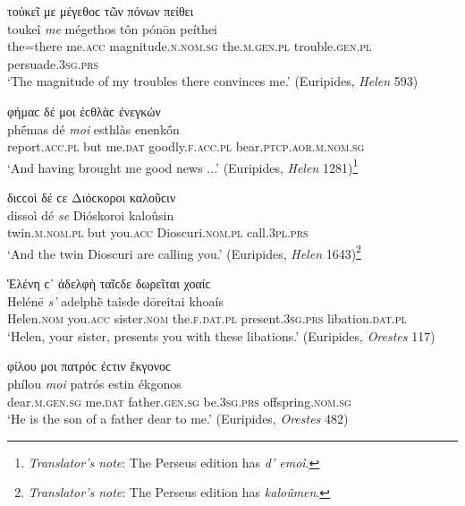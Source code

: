 \begin{exe}
\ex τοὐκεῖ με μέγεθοϲ τῶν πόνων πείθει\\
\gll toukeî \emph{me} mégethos tôn pónōn peíthei\\
the=there me.\textsc{acc} magnitude.\textsc{n.nom.sg} the.\textsc{m.gen.pl} trouble.\textsc{gen.pl} persuade.\textsc{3sg.prs}\\
\trans `The magnitude of my troubles there convinces me.' (Euripides, \textit{Helen} 593)
\label{attsep8}
\end{exe}

\begin{exe}
\ex φήμαϲ δέ μοι ἐϲθλὰϲ ἐνεγκών\\
\gll phḗmas dé \emph{moi} esthlàs enenkṓn\\
report.\textsc{acc.pl} but me.\textsc{dat} goodly.\textsc{f.acc.pl}
bear.\textsc{ptcp.aor.m.nom.sg}\\
\trans `And having brought me good news ...' (Euripides, \textit{Helen} 1281)\footnote{\emph{Translator's note}: The Perseus edition has \textit{d' emoì}.}
\label{attsep9}
\end{exe}

\begin{exe}
\ex διϲϲοὶ δέ ϲε Διόϲκοροι καλοῦϲιν\\
\gll dissoì dé \emph{se} Dióskoroi kaloûsin\\
twin.\textsc{m.nom.pl} but you.\textsc{acc} Dioscuri.\textsc{nom.pl} call.\textsc{3pl.prs}\\
\trans `And the twin Dioscuri are calling you.' (Euripides, \textit{Helen} 1643)\footnote{\emph{Translator's note}: The Perseus edition has \textit{kaloûmen}.}
\label{attsep10}
\end{exe}

\begin{exe}
\ex Ἑλένη ϲ᾽ ἀδελφὴ ταῖϲδε δωρεῖται χοαίϲ\\
\gll Helénē \emph{s'} adelphḕ taîsde dōreîtai khoaís\\
Helen.\textsc{nom} you.\textsc{acc} sister.\textsc{nom} the.\textsc{f.dat.pl} present.\textsc{3sg.prs} libation.\textsc{dat.pl}\\
\trans `Helen, your sister, presents you with these libations.' (Euripides, \textit{Orestes} 117)
\label{attsep11}
\end{exe}

\begin{exe}
\ex φίλου μοι πατρόϲ ἐϲτιν ἔκγονοϲ\\
\gll phílou \emph{moi} patrós estin ékgonos\\
dear.\textsc{m.gen.sg} me.\textsc{dat} father.\textsc{gen.sg}
be.\textsc{3sg.prs} offspring.\textsc{nom.sg}\\
\trans `He is the son of a father dear to me.' (Euripides, \textit{Orestes} 482)
\label{Or482}
\end{exe}


